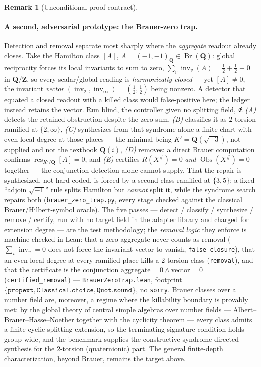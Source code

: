\documentclass[11pt]{article}
\theoremstyle{definition}
\newtheorem{remark}[theorem]{Remark}
\begin{document}
\begin{remark}[Unconditional proof contract]
\begin{enumerate}
\paragraph{A second, adversarial prototype: the Brauer-zero trap.} Detection and removal separate most
sharply where the \emph{aggregate} readout already closes. Take the Hamilton class $[A]$,
$A=(-1,-1)_{\mathbf Q}\in\operatorname{Br}(\mathbf Q)$: global reciprocity forces its local invariants to sum to
zero, $\sum_v\operatorname{inv}_v(A)=\tfrac12+\tfrac12\equiv0$ in $\mathbf Q/\mathbf Z$, so every scalar/global
reading is \emph{harmonically closed} --- yet $[A]\neq0$, the invariant \emph{vector}
$(\operatorname{inv}_2,\operatorname{inv}_\infty)=(\tfrac12,\tfrac12)$ being nonzero. A detector that equated a
closed readout with a killed class would false-positive here; the ledger instead retains the vector. Run blind,
the controller given no splitting field, $\mathfrak E$ \emph{(A)} detects the retained obstruction despite the
zero sum, \emph{(B)} classifies it as $2$-torsion ramified at $\{2,\infty\}$, \emph{(C)} synthesizes from that
syndrome alone a finite chart with even local degree at those places --- the minimal being $K'=\mathbf
Q(\sqrt{-3})$, not supplied and not the textbook $\mathbf Q(i)$, \emph{(D)} removes: a direct Brauer computation
confirms $\operatorname{res}_{K'/\mathbf Q}[A]=0$, and \emph{(E)} certifies $R(X^\#)=0$ \emph{and}
$\operatorname{Obs}(X^\#)=0$ together --- the conjunction detection alone cannot supply. That the repair is
synthesized, not hard-coded, is forced by a second class ramified at $\{3,5\}$: a fixed ``adjoin $\sqrt{-1}$'' rule
splits Hamilton but \emph{cannot} split it, while the syndrome search repairs both (\texttt{brauer\_zero\_trap.py},
every stage checked against the classical Brauer/Hilbert-symbol oracle). The five passes --- detect / classify / synthesize / remove / certify, run with no target field in the adapter library and charged for extension degree --- are the test methodology; the \emph{removal logic} they enforce is machine-checked in Lean: that a zero aggregate never counts as removal ($\sum_v\operatorname{inv}_v=0$ does not force the invariant vector to vanish, \texttt{false\_closure}), that an even local degree at every ramified place kills a $2$-torsion class (\texttt{removal}), and that the certificate is the conjunction $\text{aggregate}=0\wedge\text{vector}=0$ (\texttt{certified\_removal}) --- \texttt{BrauerZeroTrap.lean}, footprint $\{\texttt{propext},\texttt{Classical.choice},\texttt{Quot.sound}\}$, no \texttt{sorry}. Brauer classes over a number field are,
moreover, a regime where the killability boundary is provably met: by the global theory of central simple
algebras over number fields --- Albert--Brauer--Hasse--Noether together with the cyclicity theorem --- every
class admits a finite cyclic splitting extension, so the terminating-signature condition holds group-wide, and the benchmark
supplies the constructive syndrome-directed synthesis for the $2$-torsion (quaternionic) part. The general
finite-depth characterization, beyond Brauer, remains the target above.


\end{enumerate}
\end{remark}
\end{document}
